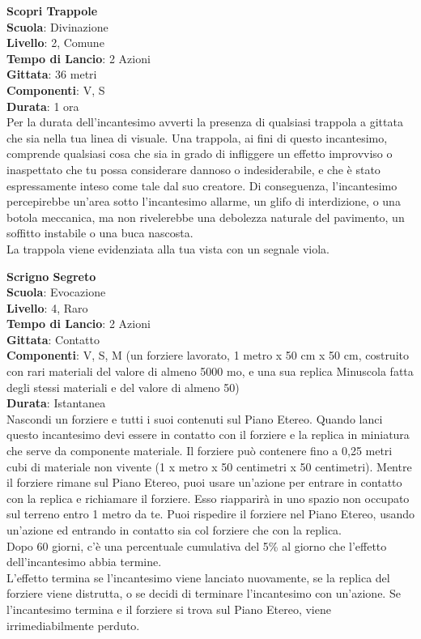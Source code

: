 \begin{multicols}{2}
\medskip\textbf{Scopri Trappole}\\
\textbf{Scuola}: Divinazione\\
\textbf{Livello}: 2, Comune\\
\textbf{Tempo di Lancio}: 2 Azioni\\
\textbf{Gittata}: 36 metri\\
\textbf{Componenti}: V, S\\
\textbf{Durata}: 1 ora\\
Per la durata dell'incantesimo avverti la presenza di qualsiasi trappola a gittata che sia nella tua linea di visuale. Una trappola, ai fini di questo incantesimo, comprende qualsiasi cosa che sia in grado di infliggere un effetto improvviso o inaspettato che tu possa considerare dannoso o indesiderabile, e che è stato espressamente inteso come tale dal suo creatore. Di conseguenza, l'incantesimo percepirebbe un'area sotto l'incantesimo allarme, un glifo di interdizione, o una botola meccanica, ma non rivelerebbe una debolezza naturale del pavimento, un soffitto instabile o una buca nascosta.\\
La trappola viene evidenziata alla tua vista con un segnale viola.

\medskip\textbf{Scrigno Segreto}\\
\textbf{Scuola}: Evocazione\\
\textbf{Livello}: 4, Raro\\
\textbf{Tempo di Lancio}: 2 Azioni\\
\textbf{Gittata}: Contatto\\
\textbf{Componenti}: V, S, M (un forziere lavorato, 1 metro x 50 cm x 50 cm, costruito con rari materiali del valore di almeno 5000 mo, e una sua replica Minuscola fatta degli stessi materiali e del valore di almeno 50) \\
\textbf{Durata}: Istantanea\\
Nascondi un forziere e tutti i suoi contenuti sul Piano Etereo. Quando lanci questo incantesimo devi essere in contatto con il forziere e la replica in miniatura che serve da componente materiale. Il forziere può contenere fino a 0,25 metri cubi di materiale non vivente (1 x metro x 50 centimetri x 50 centimetri). Mentre il forziere rimane sul Piano Etereo, puoi usare un'azione per entrare in contatto con la replica e richiamare il forziere. Esso riapparirà in uno spazio non occupato sul terreno entro 1 metro da te. Puoi rispedire il forziere nel Piano Etereo, usando un'azione ed entrando in contatto sia col forziere che con la replica.\\
Dopo 60 giorni, c'è una percentuale cumulativa del 5\% al giorno che l'effetto dell'incantesimo abbia termine. \\
L'effetto termina se l'incantesimo viene lanciato nuovamente, se la replica del forziere viene distrutta, o se decidi di terminare l'incantesimo con un'azione. Se l'incantesimo termina e il forziere si trova sul Piano Etereo, viene irrimediabilmente perduto.


\end{multicols}
